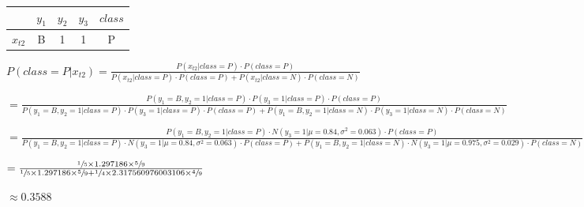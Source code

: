 \documentclass[11pt,a4paper]{article}
\begin{document}
\begin{flushleft}
  \vspace{6mm}\begin{tabular}{c|c|c|c|c|}
    \cline{2-5}
                                   & $y_1$ & $y_2$ & $y_3$ & $class$ \\ \hline
    \multicolumn{1}{|c|}{$x_{t2}$} & B     & 1     & 1     & P       \\ \hline
  \end{tabular} \par
  \vspace{3.5mm}\small $ P(class = P | x_{t2}) = \frac{P(x_{t2} | class = P) \cdot P(class = P)}{P(x_{t2} | class = P) \cdot P(class = P) + P(x_{t2} | class = N) \cdot P(class = N)} $ \par
  \vspace{2mm}\footnotesize $ = \frac{P(y_1 = B, y_2 = 1 | class = P) \cdot P(y_3 = 1 | class = P) \cdot P(class = P)}{{P(y_1 = B, y_2 = 1 | class = P) \cdot P(y_3 = 1 | class = P) \cdot P(class = P) + P(y_1 = B, y_2 = 1 | class = N) \cdot P(y_3 = 1 | class = N) \cdot P(class = N)}} $ \par
  \vspace{2mm}\footnotesize $ = \frac{P(y_1 = B, y_2 = 1 | class = P) \cdot N(y_3 = 1 | \mu = 0.84, \sigma^2 = 0.063) \cdot P(class = P)}{P(y_1 = B, y_2 = 1 | class = P) \cdot N(y_3 = 1 | \mu = 0.84, \sigma^2 = 0.063) \cdot P(class = P) + P(y_1 = B, y_2 = 1 | class = N) \cdot N(y_3 = 1 | \mu = 0.975, \sigma^2 = 0.029) \cdot P(class = N)} $ \par
  \vspace{2mm}\small $ = \frac{\sfrac{1}{5} \times 1.297186 \times \sfrac{5}{9}}{\sfrac{1}{5} \times 1.297186 \times \sfrac{5}{9} + \sfrac{1}{4} \times 2.317560976003106 \times \sfrac{4}{9}} $ \par
  \vspace{2.5mm}\small $ \approx 0.3588 $ \par


\end{flushleft}
\end{document}
